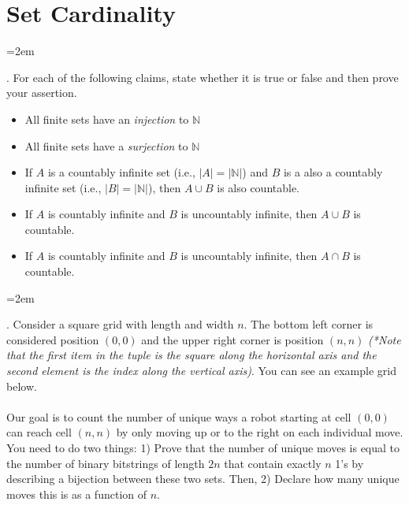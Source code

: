 \documentclass[12pt]{article}
\def\homework{Set Cardinality}
\newcounter{quesnum}
\newcommand{\question}[2][??]{
\begin{list}{\labelitemi}{\leftmargin=2em}
\item [\arabic{quesnum}.] {} {#2}
\end{list}
\addtocounter{quesnum}{1}
}
\begin{document}
\section*{\homework}


\question[3]{
For each of the following claims, state whether it is true or false and then prove your assertion.
}

\begin{itemize}
	\item All finite sets have an \emph{injection} to $\mathbb{N}$
	\item All finite sets have a \emph{surjection} to $\mathbb{N}$
	\item If $A$ is a countably infinite set (i.e., $|A|=|\mathbb{N}|$) and $B$ is a also a countably infinite set (i.e., $|B| = |\mathbb{N}|$), then $A \cup B$ is also countable.
	\item If $A$ is countably infinite and $B$ is uncountably infinite, then $A \cup B$ is countable.
	\item If $A$ is countably infinite and $B$ is uncountably infinite, then $A \cap B$ is countable.
\end{itemize}

\vspace{12pt}



\question[3]{
Consider a square grid with length and width $n$. The bottom left corner is considered position $(0,0)$ and the upper right corner is position $(n,n)$ \emph{(*Note that the first item in the tuple is the square along the horizontal axis and the second element is the index along the vertical axis)}. You can see an example grid below.\\
\\
Our goal is to count the number of unique ways a robot starting at cell $(0,0)$ can reach cell $(n,n)$ by only moving up or to the right on each individual move. You need to do two things: 1) Prove that the number of unique moves is equal to the number of binary bitstrings of length $2n$ that contain exactly $n$ 1's by describing a bijection between these two sets. Then, 2) Declare how many unique moves this is as a function of $n$.
}
\end{document}
